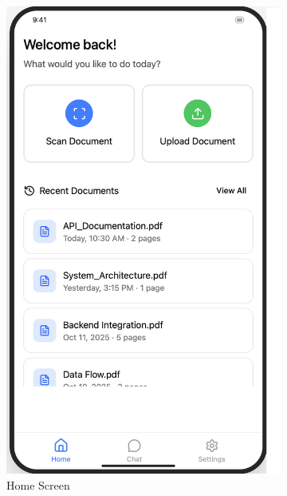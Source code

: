 \documentclass[10pt]{article}
\begin{document}
        \begin{figure}
            \centering
            \begin{subfigure}{0.3\textwidth}
                \includegraphics[width=\textwidth]{img/FrontendHomeTab.png}
                \caption{Home Screen}
                \label{fig:HomeScreen}
            \end{subfigure}
            \hfill
            \begin{subfigure}{0.3\textwidth}

\end{subfigure}
\end{figure}
\end{document}

